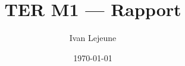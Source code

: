





\usepackage[a4paper,hmargin=30mm,vmargin=30mm]{geometry}



\title{\color{astral} \sffamily \bfseries TER M1 --- Rapport}
\author{Ivan Lejeune}
\date{\today}


    

    \newpage
    \tableofcontents

    \newpage
    
    
    
    
    
    
    

    
    

    

    \newpage
    

    \newpage
    



    


    \newpage
    
    



